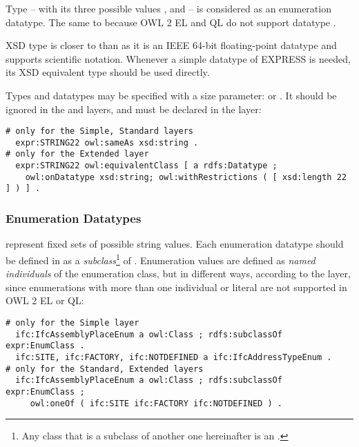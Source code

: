 Type  -- with its three possible values ,  and  -- is considered as an enumeration data\-type. The same to  because OWL 2 EL and QL do not support data\-type  \cite{motik2012owl}.

XSD type  is closer to  than  as it is an IEEE 64-bit floating-point data\-type and supports scientific notation. Whenever a simple data\-type of EXPRESS is needed, its XSD equivalent type should be used directly.

Types  and  data\-types may be specified with a size parameter:  or . It should be ignored in the \simple{} and \standard{} layers, and must be declared in the \extended{} layer:

\begin{lstlisting}
# only for the Simple, Standard layers
  expr:STRING22 owl:sameAs xsd:string .
# only for the Extended layer
  expr:STRING22 owl:equivalentClass [ a rdfs:Datatype ;
    owl:onDatatype xsd:string; owl:withRestrictions ( [ xsd:length 22 ] ) ] .
\end{lstlisting}


\subsubsection{Enumeration Datatypes} represent fixed sets of possible string values. Each enumeration data\-type should be defined in \ifcowl{} as a \emph{subclass}\footnote{Any class that is a subclass of another one hereinafter is an .} of . Enumeration values are defined as \emph{named individuals} of the enumeration class, but in different ways, according to the layer, since enumerations with more than one individual or literal are not supported in OWL 2 EL or QL:

\begin{lstlisting}
# only for the Simple layer
  ifc:IfcAssemblyPlaceEnum a owl:Class ; rdfs:subclassOf expr:EnumClass .
  ifc:SITE, ifc:FACTORY, ifc:NOTDEFINED a ifc:IfcAddressTypeEnum .
# only for the Standard, Extended layers
  ifc:IfcAssemblyPlaceEnum a owl:Class ; rdfs:subclassOf expr:EnumClass ;
     owl:oneOf ( ifc:SITE ifc:FACTORY ifc:NOTDEFINED ) .
\end{lstlisting}


